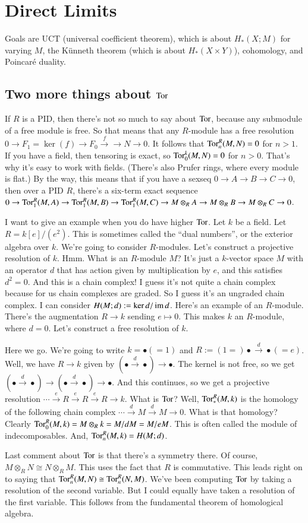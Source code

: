 \section{Direct Limits}
Goals are UCT (universal coefficient theorem), which is about $ H_\ast(X;M)$ for varying $M$, the K\"{u}nneth theorem (which is about $ H_\ast(X\times Y)$), cohomology, and Poincar\'{e} duality.
\subsection{Two more things about $\operatorname{Tor}$}
If $R$ is a PID, then there's not so much to say about $\operatorname{Tor}$, because any submodule of a free module is free. So that means that any $R$-module has a free resolution $0\to F_1=\ker(f)\to F_0\xrightarrow{f}\to N\to 0$. It follows that $\operatorname{Tor}^R_n(M,N)=0$ for $n>1$. If you have a field, then tensoring is exact, so $\operatorname{Tor}^k_0(M,N)=0$ for $n>0$. That's why it's easy to work with fields. (There's also Prufer rings, where every module is flat.) By the way, this means that if you have a sexseq $0\to A\to B\to C\to 0$, then over a PID $R$, there's a six-term exact sequence $0\to\operatorname{Tor}^R_1(M,A)\to \operatorname{Tor}^R_1(M,B)\to \operatorname{Tor}^R_1(M,C)\to M\otimes_R A\to M\otimes_R B\to M\otimes_R C\to 0$.
\begin{example}
I want to give an example when you do have higher $\operatorname{Tor}$. Let $k$ be a field. Let $R=k[e]/(e^2)$. This is sometimes called the ``dual numbers'', or the exterior algebra over $k$. We're going to consider $R$-modules. Let's construct a projective resolution of $k$. Hmm. What is an $R$-module $M$? It's just a $k$-vector space $M$ with an operator $d$ that has action given by multiplication by $e$, and this satisfies $d^2=0$. And this is a chain complex! I guess it's not quite a chain complex because for us chain complexes are graded. So I guess it's an ungraded chain complex. I can consider $ H(M;d):=\ker d/\operatorname{im} d$. Here's an example of an $R$-module. There's the augmentation $R\to k$ sending $e\mapsto 0$. This makes $k$ an $R$-module, where $d=0$. Let's construct a free resolution of $k$.

Here we go. We're going to write $k=\bullet(=1)$ and $R:=(1=)\bullet\xrightarrow{d}\bullet(=e)$. Well, we have $R\to k$ given by $(\bullet\xrightarrow{d}\bullet)\to \bullet$. The kernel is not free, so we get $(\bullet\xrightarrow{d}\bullet)\to (\bullet\xrightarrow{d}\bullet)\to \bullet$. And this continues, so we get a projective resolution $\cdots\xrightarrow{e} R\xrightarrow{e} R\xrightarrow{e} R\to k$. What is $\operatorname{Tor}$? Well, $\operatorname{Tor}^R_\ast(M,k)$ is the homology of the following chain complex $\cdots\xrightarrow{d} M\xrightarrow{d} M\to 0$. What is that homology? Clearly $\operatorname{Tor}^R_0(M,k)=M\otimes_R k=M/dM=M/eM$. This is often called the module of indecomposables. And, $\operatorname{Tor}^R_n(M,k)= H(M;d)$.
\end{example}
Last comment about $\operatorname{Tor}$ is that there's a symmetry there. Of course, $M\otimes_R N\cong N\otimes_R M$. This uses the fact that $R$ is commutative. This leads right on to saying that $\operatorname{Tor}^R_n(M,N)\cong \operatorname{Tor}^R_n(N,M)$. We've been computing $\operatorname{Tor}$ by taking a resolution of the second variable. But I could equally have taken a resolution of the first variable. This follows from the fundamental theorem of homological algebra.
